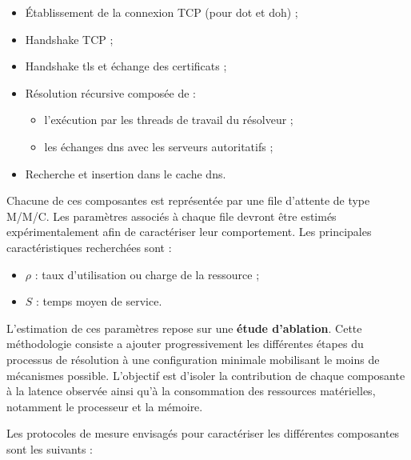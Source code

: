 \documentclass[12pt, a4paper]{report}
\begin{document}
	\begin{itemize}
		\item Établissement de la connexion TCP (pour \gls{dot} et \gls{doh}) ;
		\item Handshake TCP ;
		\item Handshake \gls{tls} et échange des certificats ;
		\item Résolution récursive composée de :
		\begin{itemize}
			\item l'exécution par les threads de travail du résolveur ;
			\item les échanges \gls{dns} avec les serveurs autoritatifs ;
		\end{itemize}
		\item Recherche et insertion dans le cache \gls{dns}.
	\end{itemize}

	Chacune de ces composantes est représentée par une file d'attente de type M/M/C. Les paramètres associés à chaque file devront être estimés expérimentalement afin de caractériser leur comportement. Les principales caractéristiques recherchées sont :

	\begin{itemize}
		\item $\rho$ : taux d'utilisation ou charge de la ressource ;
		\item $S$ : temps moyen de service.
	\end{itemize}

	L'estimation de ces paramètres repose sur une \textbf{étude d'ablation}. Cette méthodologie consiste a ajouter progressivement les différentes étapes du processus de résolution à une configuration minimale mobilisant le moins de mécanismes possible. L'objectif est d'isoler la contribution de chaque composante à la latence observée ainsi qu'à la consommation des ressources matérielles, notamment le processeur et la mémoire.

	Les protocoles de mesure envisagés pour caractériser les différentes composantes sont les suivants :
\end{document}
